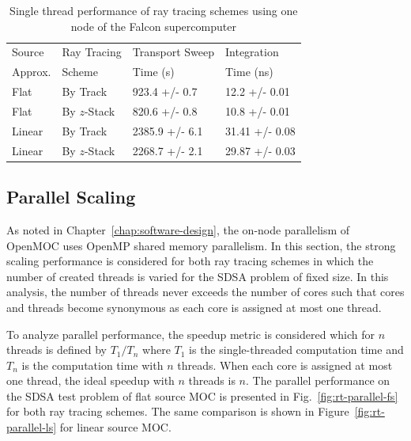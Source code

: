 \begin{table}[ht]
	\centering
	\caption{Single thread performance of ray tracing schemes using one node of the Falcon supercomputer}
	\medskip
	\begin{tabular}{l|l|l|l}
		\hline
		Source &  Ray Tracing & Transport Sweep & Integration \\
		Approx. &  Scheme & Time (s) & Time (ns) \\
		\hline
		Flat & By Track & 923.4 +/- 0.7 & 12.2 +/- 0.01 \\
		Flat & By $z$-Stack & 820.6 +/- 0.8 & 10.8 +/- 0.01 \\
		Linear & By Track & 2385.9 +/- 6.1 & 31.41 +/- 0.08 \\
		Linear & By $z$-Stack & 2268.7 +/- 2.1 & 29.87 +/- 0.03 \\
		\hline
	\end{tabular}
	\label{tab:rt-single-thread}
\end{table}

\subsection{Parallel Scaling}

As noted in Chapter~\ref{chap:software-design}, the on-node parallelism of OpenMOC uses OpenMP shared memory parallelism. In this section, the strong scaling performance is considered for both ray tracing schemes in which the number of created threads is varied for the SDSA problem of fixed size. In this analysis, the number of threads never exceeds the number of cores such that cores and threads become synonymous as each core is assigned at most one thread. 

To analyze parallel performance, the speedup metric is considered which for $n$ threads is defined by $T_1 / T_n$ where $T_1$ is the single-threaded computation time and $T_n$ is the computation time with $n$ threads. When each core is assigned at most one thread, the ideal speedup with $n$ threads is $n$. The parallel performance on the SDSA test problem of flat source \ac{MOC} is presented in Fig.~\ref{fig:rt-parallel-fs} for both ray tracing schemes. The same comparison is shown in Figure~\ref{fig:rt-parallel-ls} for linear source \ac{MOC}.

